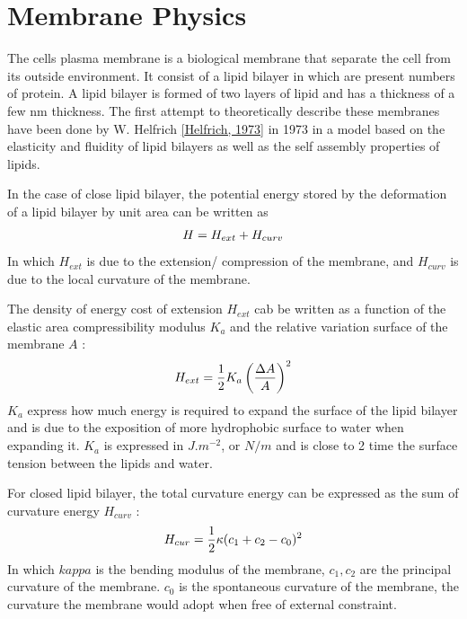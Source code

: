\documentclass[A4paperpaper,11pt,english]{sphinxmanual}
\begin{document}
\section{Membrane Physics}
\label{parts/part1:membrane-physics}
The cells plasma membrane is a biological membrane that separate the cell from
its outside environment.  It consist of a lipid bilayer in which are present
numbers of protein.  A lipid bilayer is formed of two layers of lipid and has a
thickness of a few nm thickness. The first attempt to theoretically describe
these membranes have been done by W. Helfrich {\hyperref[parts/part1:helfrich]{{[}Helfrich,  1973{]}}} in 1973 in a
model based on the elasticity and fluidity of lipid bilayers as well as the
self assembly properties of  lipids.

In the case of close lipid bilayer, the potential energy stored by the
deformation of a lipid bilayer by unit area can be  written as
\begin{gather}
\begin{split}H = H_{ext} + H_{curv}\end{split}\notag
\end{gather}
In which \(H_{ext}\) is due to the extension/ compression of the membrane,
and \(H_{curv}\) is due to the local curvature of the membrane.

The density of energy cost of extension \(H_{ext}\) cab be written as a
function  of the elastic area compressibility modulus \(K_a\) and the
relative variation surface of the membrane \(A\) :
\begin{gather}
\begin{split}H_{ext} = \frac 1 2 K_a \left(\frac{\Delta A}{A}\right)^2\end{split}\notag
\end{gather}
\(K_a\) express how much energy is required to expand the surface of the
lipid bilayer and is due to the exposition of more hydrophobic surface to water
when expanding it. \(K_a\) is expressed in \(J.m^{-2}\), or \(N/m\)
and is close to 2 time the surface tension between the lipids and water.

For closed lipid bilayer, the total curvature energy can be expressed as the
sum of curvature energy \(H_{curv}\) :
\begin{gather}
\begin{split}H_{cur} = \frac 1 2 \kappa (c_1 + c_2 -c_0)^2\end{split}\notag
\end{gather}
In which \(kappa\) is the bending modulus of the membrane, \(c_1,c_2\)
are the principal curvature of the membrane. \(c_0\) is the spontaneous
curvature of the membrane, the curvature the membrane would adopt when free of
external constraint.
\end{document}
